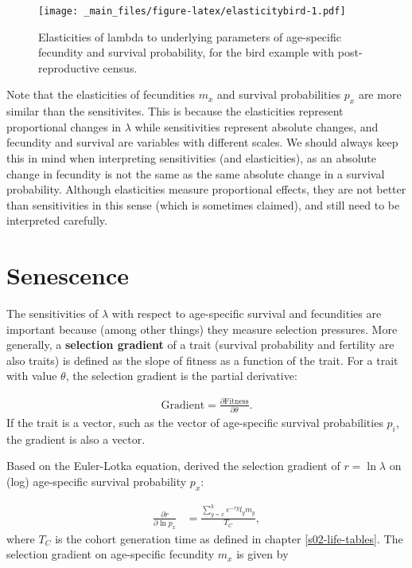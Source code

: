 \documentclass[
]{book}
\begin{document}
\begin{figure}
\centering
\texttt{[image: \_main\_files/figure-latex/elasticitybird-1.pdf]}
\caption{\label{fig:elasticitybird}Elasticities of lambda to underlying parameters of age-specific fecundity and survival probability, for the bird example with post-reproductive census.}
\end{figure}

Note that the elasticities of fecundities \(m_x\) and survival probabilities \(p_x\) are more similar than the sensitivites. This is because the elasticities represent proportional changes in \(\lambda\) while sensitivities represent absolute changes, and fecundity and survival are variables with different scales. We should always keep this in mind when interpreting sensitivities (and elasticities), as an absolute change in fecundity is not the same as the same absolute change in a survival probability. Although elasticities measure proportional effects, they are not better than sensitivities in this sense (which is sometimes claimed), and still need to be interpreted carefully.

\hypertarget{senescence}{%
\section{Senescence}\label{senescence}}

The sensitivities of \(\lambda\) with respect to age-specific survival and fecundities are important because (among other things) they measure selection pressures. More generally, a \textbf{selection gradient} of a trait (survival probability and fertility are also traits) is defined as the slope of fitness as a function of the trait. For a trait with value \(\theta\), the selection gradient is the partial derivative:

\begin{align} 
\text{Gradient}=\frac{\partial \text{Fitness}}{\partial \theta}.
\end{align}
If the trait is a vector, such as the vector of age-specific survival probabilities \(p_i\), the gradient is also a vector.

Based on the Euler-Lotka equation, \citet{Hamilton1} derived the selection gradient of \(r=\ln\lambda\) on (log) age-specific survival probability \(p_x\):

\begin{align} 
\frac{\partial r}{\partial \ln p_x}&=\frac{\sum_{y=x}^ke^{-ry}l_ym_y}{T_C},
\end{align}
where \(T_C\) is the cohort generation time as defined in chapter \ref{s02-life-tables}. The selection gradient on age-specific fecundity \(m_x\) is given by
\end{document}
